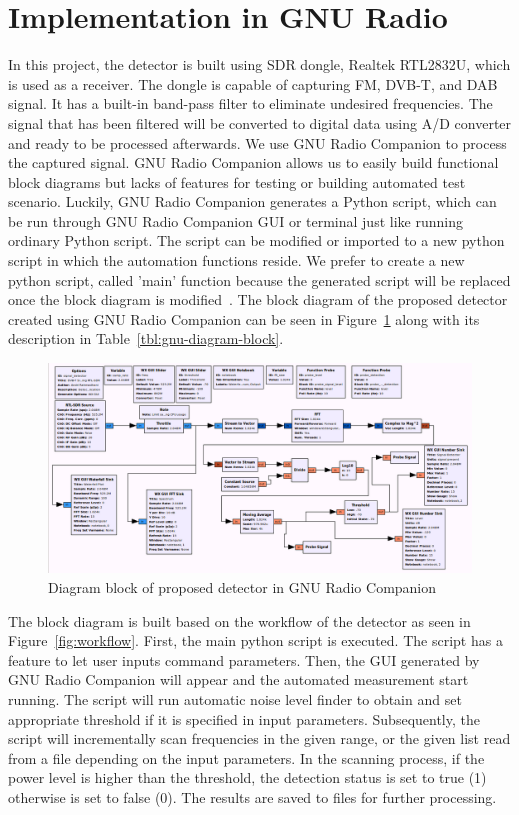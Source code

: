 \section{Implementation in GNU Radio}

In this project, the detector is built using SDR dongle, Realtek RTL2832U, which is used as a receiver. The dongle is capable of capturing FM, DVB-T, and DAB signal. It has a built-in band-pass filter to eliminate undesired frequencies. The signal that has been filtered will be converted to digital data using A/D converter and ready to be processed afterwards. We use GNU Radio Companion to process the captured signal. GNU Radio Companion allows us to easily build functional block diagrams but lacks of features for testing or building automated test scenario. Luckily, GNU Radio Companion generates a Python script, which can be run through GNU Radio Companion GUI or terminal just like running ordinary Python script. The script can be modified or imported to a new python script in which the automation functions reside. We prefer to create a new python script, called 'main' function because the generated script will be replaced once the block diagram is modified~\cite{gnuradio2016,alexandrucsete2011,sivantoledo2012}. The block diagram of the proposed detector created using GNU Radio Companion can be seen in Figure~\ref{fig:gnuradio-block-diagram} along with its description in Table~\ref{tbl:gnu-diagram-block}.

\begin{figure}[h]
    \centering
    \includegraphics[width=\textwidth]{figures/gnuradio-block-diagram}
    \caption{Diagram block of proposed detector in GNU Radio Companion}
    \label{fig:gnuradio-block-diagram}
\end{figure}

The block diagram is built based on the workflow of the detector as seen in Figure~\ref{fig:workflow}. First, the main python script is executed. The script has a feature to let user inputs command parameters. Then, the GUI generated by GNU Radio Companion will appear and the automated measurement start running. The script will run automatic noise level finder to obtain and set appropriate threshold if it is specified in input parameters. Subsequently, the script will incrementally scan frequencies in the given range, or the given list read from a file depending on the input parameters. In the scanning process, if the power level is higher than the threshold, the detection status is set to true (1) otherwise is set to false (0). The results are saved to files for further processing.

